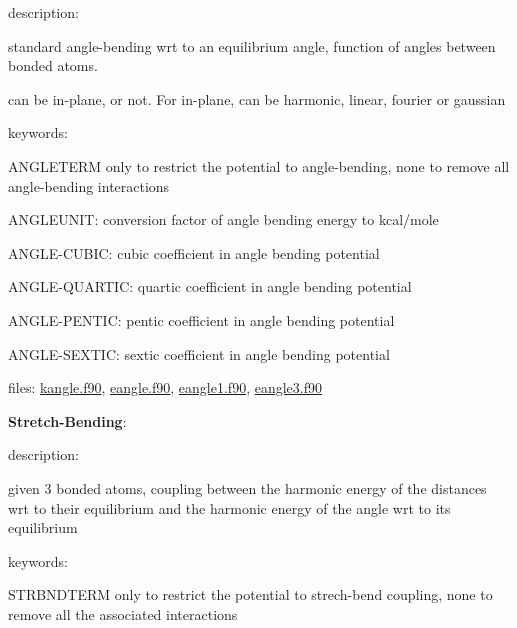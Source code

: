 \begin{DoxyItemize}
\begin{DoxyItemize}
\item description\-:
\begin{DoxyItemize}
\item standard angle-\/bending wrt to an equilibrium angle, function of angles between bonded atoms.
\item can be in-\/plane, or not. For in-\/plane, can be harmonic, linear, fourier or gaussian
\end{DoxyItemize}
\item keywords\-:
\begin{DoxyItemize}
\item A\-N\-G\-L\-E\-T\-E\-R\-M only to restrict the potential to angle-\/bending, none to remove all angle-\/bending interactions
\item A\-N\-G\-L\-E\-U\-N\-I\-T\-: conversion factor of angle bending energy to kcal/mole
\item A\-N\-G\-L\-E-\/\-C\-U\-B\-I\-C\-: cubic coefficient in angle bending potential
\item A\-N\-G\-L\-E-\/\-Q\-U\-A\-R\-T\-I\-C\-: quartic coefficient in angle bending potential
\item A\-N\-G\-L\-E-\/\-P\-E\-N\-T\-I\-C\-: pentic coefficient in angle bending potential
\item A\-N\-G\-L\-E-\/\-S\-E\-X\-T\-I\-C\-: sextic coefficient in angle bending potential
\end{DoxyItemize}
\item files\-: \hyperlink{kangle_8f90}{kangle.\-f90}, \hyperlink{eangle_8f90}{eangle.\-f90}, \hyperlink{eangle1_8f90}{eangle1.\-f90}, \hyperlink{eangle3_8f90}{eangle3.\-f90}
\end{DoxyItemize}
\item {\bfseries Stretch-\/\-Bending}\-:
\begin{DoxyItemize}
\item description\-:
\begin{DoxyItemize}
\item given 3 bonded atoms, coupling between the harmonic energy of the distances wrt to their equilibrium and the harmonic energy of the angle wrt to its equilibrium
\end{DoxyItemize}
\item keywords\-:
\begin{DoxyItemize}
\item S\-T\-R\-B\-N\-D\-T\-E\-R\-M only to restrict the potential to strech-\/bend coupling, none to remove all the associated interactions

\end{DoxyItemize}
\end{DoxyItemize}
\end{DoxyItemize}
